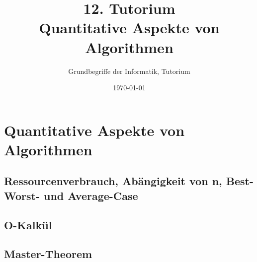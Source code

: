 




\title[Quantitative Aspekte von Algorithmen]{12. Tutorium\\  Quantitative Aspekte von Algorithmen}
\subtitle{Grundbegriffe der Informatik, Tutorium \hashtag\mytutnumber}
\date{\today}



\titleframe
\roadmap


\section{Quantitative Aspekte von Algorithmen}
\newcommand{\Rplus}{\ensuremath{\nR_+}}
\newcommand{\Rnullplus}{\ensuremath{\nR^+_0}}
\subsection{Ressourcenverbrauch, Abängigkeit von n, Best- Worst- und Average-Case}

\subsection{O-Kalkül}

\subsection{Master-Theorem}



